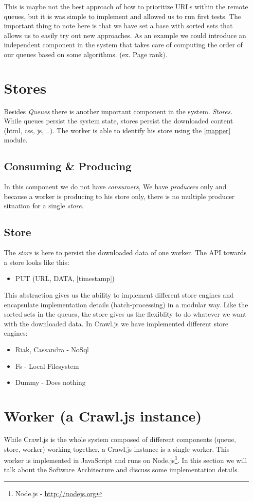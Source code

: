 This is maybe not the best approach of how to prioritize URLs within the remote queues, but it is was simple to implement and allowed us to run first tests. The important thing to note here is that we have set a base with sorted sets that allows us to easily try out new approaches. As an example we could introduce an independent component in the system that takes care of computing the order of our queues based on some algorithms. (ex. Page rank).

\section{Stores}
Besides \emph{Queues} there is another important component in the system. \emph{Stores}. While queues persist the system state, stores persist the downloaded content (html, css, js, ..). The worker is able to identify his store using the \ref{mapper} module.
\subsection{Consuming \& Producing}
In this component we do not have \emph{consumers}, We have \emph{producers} only and because a worker is producing to his store only, there is no multiple producer situation for a single \emph{store}.

\subsection{Store}
The \emph{store} is here to persist the downloaded data of one worker. The API towards a store looks like this:
\begin{itemize}
  \item PUT (URL, DATA, [timestamp])
\end{itemize}
This abstraction gives us the ability to implement different store engines and encapsulate implementation details (batch-processing) in a modular way. Like the sorted sets in the queues, the store gives us the flexiblity to do whatever we want with the downloaded data. In Crawl.js we have implemented different store engines:
\begin{itemize}
  \item Riak, Cassandra - NoSql
  \item Fs - Local Filesystem
  \item Dummy - Does nothing
\end{itemize}

\section{Worker (a Crawl.js instance)}
\label{worker}
While Crawl.js is the whole system composed of different components (queue, store, worker) working together, a Crawl.js instance is a single worker. This worker is implemented in JavaScript and runs on Node.js\footnote{Node.js - \url{http://nodejs.org}}.
In this section we will talk about the Software Architecture and discuss some implementation details.

